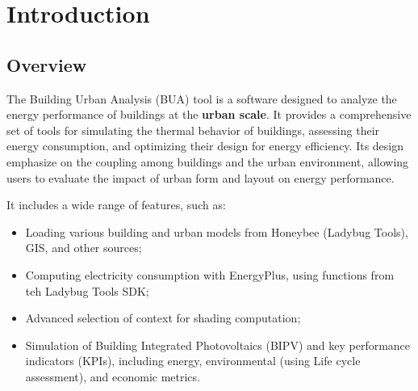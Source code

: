 \documentclass[a4paper,12pt]{article} %
\begin{document}
    \newpage

\printglossary[title=Glossary, toctitle=Glossary,style = long, nonumberlist,nopostdot]


\newpage

    \section{Introduction}

    \subsection{Overview}
    The Building Urban Analysis (BUA) tool is a software designed to analyze the energy performance of buildings at the \textbf{urban scale}.
    It provides a comprehensive set of tools for simulating the thermal behavior of buildings, assessing their energy consumption, and optimizing their design for energy efficiency.
    Its design emphasize on the coupling among buildings and the urban environment, allowing users to evaluate the impact of urban form and layout on energy performance.

    \smallbreak
    It includes a wide range of features, such as:
    \begin{itemize}
        \item Loading various building and urban models from Honeybee (Ladybug Tools), GIS, and other sources;
        \item Computing electricity consumption with EnergyPlus, using functions from teh Ladybug Tools SDK;
        \item Advanced selection of context for shading computation;
        \item Simulation of Building Integrated Photovoltaics (BIPV) and key performance indicators (KPIs), including energy, environmental (using Life cycle assessment), and economic metrics.
    \end{itemize}
\end{document}
